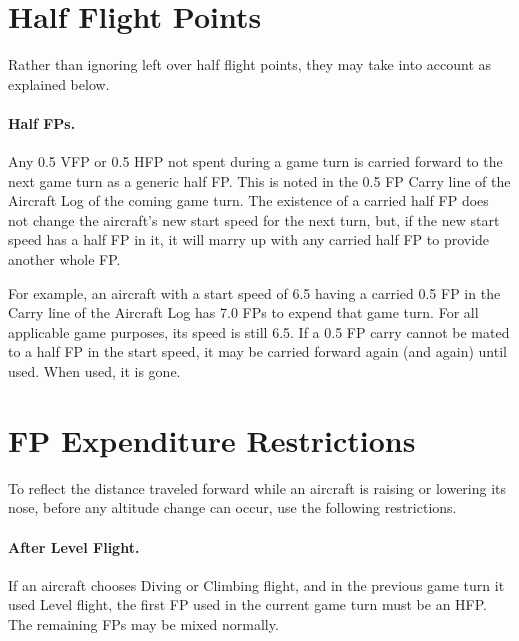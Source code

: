 \begin{advancedrules}

\section{Half Flight Points}
\label{rule:half-fps}


Rather than ignoring left over half flight points, they may take into account as explained below.

\paragraph{Half FPs.} 
Any 0.5 VFP or 0.5 HFP not spent during a game turn is carried forward to the next game turn as a generic half FP. This is noted in the 0.5 FP Carry line of the Aircraft Log of the coming game turn. The existence of a carried half FP does not change the aircraft's new start speed for the next turn, but, if the new start speed has a half FP in it, it will marry up with any carried half FP to provide another whole FP.

For example, an aircraft with a start speed of 6.5 having a carried 0.5 FP in the Carry line of the Aircraft Log has 7.0 FPs to expend that game turn. For all applicable game purposes, its speed is still 6.5. If a 0.5 FP carry cannot be mated to a half FP in the start speed, it may be carried forward again (and again) until used. When used, it is gone.

\section{FP Expenditure Restrictions}
\label{rule:changing-flight-type}

To reflect the distance traveled forward while an aircraft is raising or lowering its nose, before any altitude change can occur, use the following restrictions.

\paragraph{After Level Flight.} 
If an aircraft chooses Diving or Climbing flight, and in the previous game turn it used Level flight, the first FP used in the current game turn must be an HFP. The remaining FPs may be mixed normally.


\end{advancedrules}
